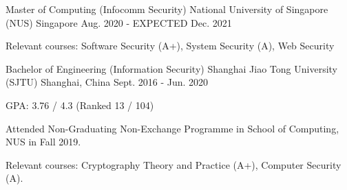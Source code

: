 


\begin{cventries}


    \cventry
    {Master of Computing (Infocomm Security)} %
    {National University of Singapore (NUS)} %
    {Singapore} %
    {Aug. 2020 - EXPECTED Dec. 2021} %
    {
        \begin{cvitems}
            \item Relevant courses: Software Security (A+), System Security (A), Web Security
        \end{cvitems}
    } %


    \cventry
    {Bachelor of Engineering (Information Security)} %
    {Shanghai Jiao Tong University (SJTU)} %
    {Shanghai, China} %
    {Sept. 2016 - Jun. 2020} %
    { %
        \begin{cvitems}
            \item GPA: 3.76 / 4.3 (Ranked 13 / 104)
            \item Attended Non-Graduating Non-Exchange Programme in School of Computing, NUS in Fall 2019.
            \item Relevant courses: Cryptography Theory and Practice (A+), Computer Security (A).
        \end{cvitems}
    }


\end{cventries}
